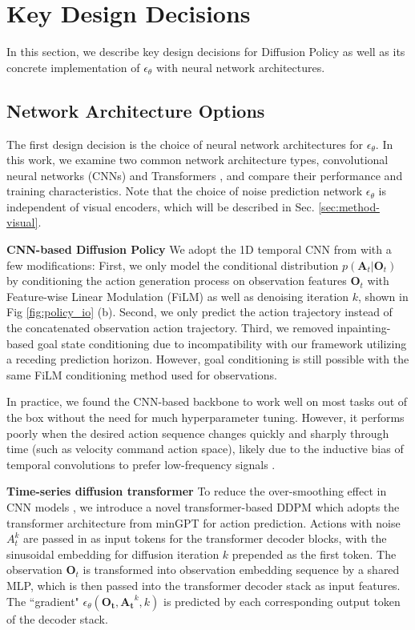 \documentclass[Afour,sageh,times]{sagej}
\begin{document}
\section{Key Design Decisions}
 In this section, we describe key design decisions for Diffusion Policy as well as its concrete implementation of $\epsilon_\theta$ with neural network architectures.

\subsection{Network Architecture Options}
\label{sec:method-network}
The first design decision is the choice of neural network architectures for $\epsilon_\theta$.
In this work, we examine two common network architecture types, convolutional neural networks (CNNs) \cite{ronneberger2015u} and Transformers \cite{vaswani2017attention}, and compare their performance and training characteristics. Note that the choice of noise prediction network $\epsilon_\theta$ is independent of visual encoders, which will be described in Sec. \ref{sec:method-visual}.

\textbf{CNN-based Diffusion Policy}
We adopt the 1D temporal CNN from \citet{pmlr-v162-janner22a} with a few modifications:
First, we only model the conditional distribution $p(\mathbf{A}_t|\mathbf{O}_t)$ by conditioning the action generation process on observation features $\mathbf{O}_t$ with Feature-wise Linear Modulation (FiLM) \cite{perez2018film} as well as denoising iteration $k$, shown in Fig \ref{fig:policy_io} (b).
Second, we only predict the action trajectory instead of the concatenated observation action trajectory.
Third, we removed inpainting-based goal state conditioning due to incompatibility with our framework utilizing a receding prediction horizon. However, goal conditioning is still possible with the same FiLM conditioning method used for observations.

In practice, we found the CNN-based backbone to work well on most tasks out of the box without the need for much hyperparameter tuning. However, it performs poorly when the desired action sequence changes quickly and sharply through time (such as velocity command action space), likely due to the inductive bias of temporal convolutions to prefer low-frequency signals \cite{tancik2020fourier}.

\textbf{Time-series diffusion transformer}
To reduce the over-smoothing effect in CNN models \cite{tancik2020fourier}, we introduce a novel transformer-based DDPM which adopts the transformer architecture from minGPT \cite{bet} for action prediction.
Actions with noise $A_t^k$ are passed in as input tokens for the transformer decoder blocks, with the sinusoidal embedding for diffusion iteration $k$ prepended as the first token.
The observation $\mathbf{O}_t$ is transformed into observation embedding sequence by a shared MLP, which is then passed into the transformer decoder stack as input features.
The ``gradient" $\epsilon_\theta(\mathbf{O_t},\mathbf{A_t}^k,k)$ is predicted by each corresponding output token of the decoder stack.
\end{document}
